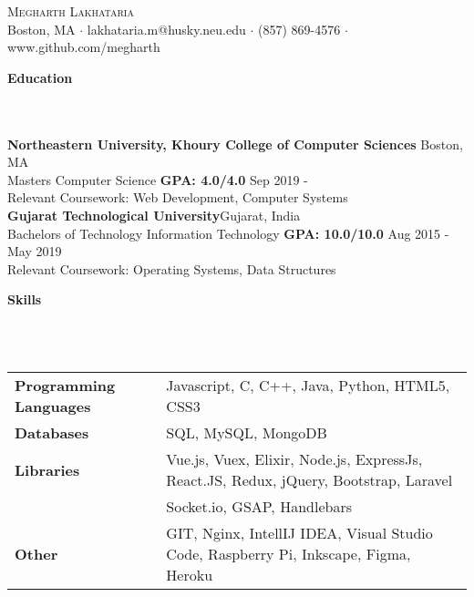 \documentclass[]{article}
\newcommand{\lineunder} {
    \vspace*{-8pt} \\
    \hrulefill \\
}
\newcommand{\header} [1] {
    {\vspace*{6pt} \fontsize{12}{12}\selectfont \textbf{#1}}
     \lineunder
}
\begin{document}
\vspace*{-40pt}

    

\begin{center}
	{\LARGE \scshape {Megharth Lakhataria}}\\
	Boston, MA $\cdot$ lakhataria.m@husky.neu.edu $\cdot$ (857) 869-4576 $\cdot$ www.github.com/megharth\\
\end{center}

\header{Education}
\hspace{1mm}
\textbf{Northeastern University, Khoury College of Computer Sciences}
\hfill
Boston, MA\\
\hspace{1mm}
Masters Computer Science \textbf{GPA: 4.0/4.0} \hfill Sep 2019 - \\
\hspace{1mm}
Relevant Coursework: Web Development, Computer Systems \\
\vspace{2mm}
\hspace{1mm}
\textbf{Gujarat Technological University}\hfill Gujarat, India\\
\hspace{1mm}
Bachelors of Technology Information Technology \textbf{GPA: 10.0/10.0} \hfill
Aug 2015 - May 2019\\
\hspace{1mm}
Relevant Coursework: Operating Systems, Data Structures \\
\vspace{2mm}


\header{Skills}
\vspace{1mm}
\begin{tabular}{ l l }
	\textbf{Programming Languages} & Javascript, C, C++, Java, Python, HTML5, CSS3            \\
	\textbf{Databases}             & SQL, MySQL, MongoDB                                      \\
    
    \textbf{Libraries}             & Vue.js, Vuex, Elixir, Node.js, ExpressJs, React.JS,
    Redux, jQuery, Bootstrap, Laravel  \\
                          & Socket.io, GSAP, Handlebars \\
    
    \textbf{Other}                & GIT, Nginx, IntellIJ IDEA, Visual Studio Code,
    Raspberry Pi, Inkscape, Figma, Heroku \\          
\end{tabular}
\vspace{2mm}
\end{document}
